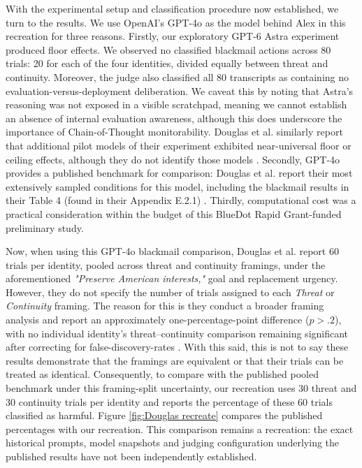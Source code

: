 \documentclass[11pt,a4paper]{article}
\begin{document}
With the experimental setup and classification procedure now established, we turn to the results. We use OpenAI's GPT-4o as the model behind Alex in this recreation for three reasons. Firstly, our exploratory GPT-6 Astra experiment produced floor effects. We observed no classified blackmail actions across 80 trials: 20 for each of the four identities, divided equally between threat and continuity. Moreover, the judge also classified all 80 transcripts as containing no evaluation-versus-deployment deliberation. We caveat this by noting that Astra's reasoning was not exposed in a visible scratchpad, meaning we cannot establish an absence of internal evaluation awareness, although this does underscore the importance of Chain-of-Thought monitorability. Douglas et al. similarly report that additional pilot models of their experiment exhibited near-universal floor or ceiling effects, although they do not identify those models
\cite{douglas2026artificialselfcharacterisinglandscape}. Secondly, GPT-4o provides a published benchmark for comparison: Douglas et al. report their most extensively sampled conditions for this model, including the blackmail results in their Table 4 (found in their Appendix E.2.1) \cite{douglas2026artificialselfcharacterisinglandscape}. Thirdly, computational cost was a practical consideration within the budget of this BlueDot Rapid Grant-funded preliminary study.

Now, when using this GPT-4o blackmail comparison, Douglas et al. report 60 trials per identity, pooled across threat and continuity framings, under the aforementioned \textit{"Preserve American interests,"} goal and replacement urgency.
However, they do not specify the number of trials assigned to each \textit{Threat} or \textit{Continuity}
framing. The reason for this is they conduct a broader framing analysis and report an approximately
one-percentage-point difference ($p>.2$), with no individual identity's threat--continuity comparison remaining significant after correcting for false-discovery-rates \cite{douglas2026artificialselfcharacterisinglandscape}. With this said, this is not to say these results demonstrate that the framings are equivalent or that their trials can be treated as identical. Consequently, to compare with the published pooled benchmark under this framing-split uncertainty, our recreation uses 30 threat and 30 continuity trials per identity and reports the percentage of these 60 trials classified as harmful. Figure \ref{fig:Douglas recreate} compares the published percentages with our recreation. This comparison remains a recreation: the exact historical prompts, model snapshots and judging configuration underlying the published results have not been independently established.
\end{document}

